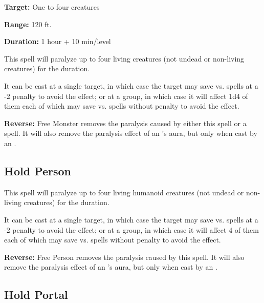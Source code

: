 \begin{multicols*}{2}
{\textbf{Target:} One to four creatures

\textbf{Range:} 120 ft.

\textbf{Duration:} 1 hour + 10 min/level}

This spell will paralyze up to four living creatures (not undead or non-living creatures) for the duration.

It can be cast at a single target, in which case the target may save vs. spells at a -2 penalty to avoid the effect; or at a group, in which case it will affect 1d4 of them each of which may save vs. spells without penalty to avoid the effect.

\textbf{Reverse:} \hypertarget{spell:Free Monster}{Free Monster} removes the paralysis caused by either this spell or a  spell. It will also remove the paralysis effect of an ’s aura, but only when cast by an .

\subsection{Hold Person}\label{spell:Hold Person}

This spell will paralyze up to four living humanoid creatures (not undead or non-living creatures) for the duration.

It can be cast at a single target, in which case the target may save vs. spells at a -2 penalty to avoid the effect; or at a group, in which case it will affect 4 of them each of which may save vs. spells without penalty to avoid the effect.

\textbf{Reverse:} \hypertarget{spell:Free Person}{Free Person} removes the paralysis caused by this spell. It will also remove the paralysis effect of an ’s aura, but only when cast by an .

\subsection{Hold Portal}\label{spell:Hold Portal}
\end{multicols*}
